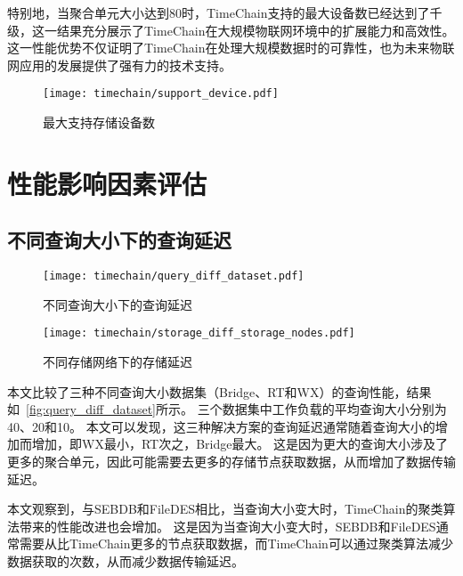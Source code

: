 特别地，当聚合单元大小达到80时，TimeChain支持的最大设备数已经达到了千级，这一结果充分展示了TimeChain在大规模物联网环境中的扩展能力和高效性。
这一性能优势不仅证明了TimeChain在处理大规模数据时的可靠性，也为未来物联网应用的发展提供了强有力的技术支持。
\begin{figure}[t]
    \centering
    \texttt{[image: timechain/support\_device.pdf]}
    \caption{最大支持存储设备数}
    \label{fig:support_device}
\end{figure}

\section{性能影响因素评估}
\subsection{不同查询大小下的查询延迟}
\begin{figure}[t]
    \centering
	\begin{minipage}{0.4\linewidth}
        \centering
        \texttt{[image: timechain/query\_diff\_dataset.pdf]}
        \caption{不同查询大小下的查询延迟}
        \label{fig:query_diff_dataset}
	\end{minipage}
	\quad
	\begin{minipage}{0.4\linewidth}
        \centering
        \texttt{[image: timechain/storage\_diff\_storage\_nodes.pdf]}
        \caption{不同存储网络下的存储延迟}
        \label{fig:storage_diff_storage_nodes}
    \end{minipage}
\end{figure}
本文比较了三种不同查询大小数据集（Bridge、RT和WX）的查询性能，结果如~\autoref{fig:query_diff_dataset}所示。
三个数据集中工作负载的平均查询大小分别为40、20和10。
本文可以发现，这三种解决方案的查询延迟通常随着查询大小的增加而增加，即WX最小，RT次之，Bridge最大。
这是因为更大的查询大小涉及了更多的聚合单元，因此可能需要去更多的存储节点获取数据，从而增加了数据传输延迟。

本文观察到，与SEBDB和FileDES相比，当查询大小变大时，TimeChain的聚类算法带来的性能改进也会增加。
这是因为当查询大小变大时，SEBDB和FileDES通常需要从比TimeChain更多的节点获取数据，而TimeChain可以通过聚类算法减少数据获取的次数，从而减少数据传输延迟。


